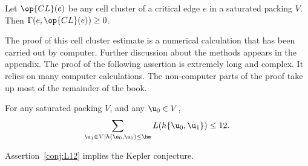 \begin{theorem}
\label{lemma:cluster}
Let $\op{CL}(e)$ be any cell cluster of a critical edge $e$ in a saturated packing $V$.  
Then $\Gamma(e,\op{CL}(e))\ge 0$.
\end{theorem}

The proof of this cell cluster estimate is a numerical calculation
that has been carried out by computer.  Further discussion about the
methods appears in the appendix. The proof of the following assertion
is extremely long and complex.  It relies on many computer
calculations.  The non-computer parts of the proof take up most of the
remainder of the book.

\begin{assertion}\label{conj:L12} 
  For any  saturated packing $ V$, and any $ \u_0\in V$,
\begin{equation}\label{eqn:L12}
\sum_{ \u_1\in V\mid h( \u_0, \u_1)\le \hm} L(h\{\u_0, \u_1\}) \le 12.
\end{equation}
\end{assertion}

\begin{lemma}\label{theorem:mk2}
Assertion~\ref{conj:L12} implies the Kepler conjecture.
\end{lemma}

